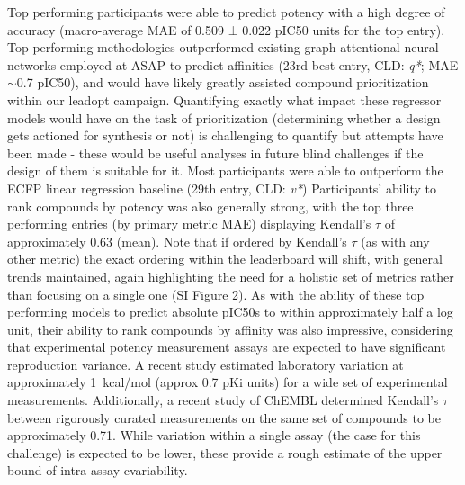 \documentclass[journal=jcim,manuscript=article]{achemso}
\begin{document}
Top performing participants were able to predict potency with a high degree of accuracy (macro-average MAE of 0.509 ± 0.022 pIC50 units for the top entry). Top performing methodologies outperformed existing graph attentional neural networks employed at ASAP to predict affinities (23rd best entry, CLD: \textit{q*}; MAE$\sim$0.7 pIC50), and would have likely greatly assisted compound prioritization within our leadopt campaign. Quantifying exactly what impact these regressor models would have on the task of prioritization (determining whether a design gets actioned for synthesis or not) is challenging to quantify but attempts have been made - these would be useful analyses in future blind challenges if the design of them is suitable for it.\cite{ash_practically_2024} Most participants were able to outperform the ECFP linear regression baseline (29th entry, CLD: \textit{v*}) Participants' ability to rank compounds by potency was also generally strong, with the top three performing entries (by primary metric MAE) displaying Kendall's $\tau$ of approximately 0.63 (mean). Note that if ordered by Kendall's $\tau$ (as with any other metric) the exact ordering within the leaderboard will shift, with general trends maintained, again highlighting the need for a holistic set of metrics rather than focusing on a single one (SI Figure 2). As with the ability of these top performing models to predict absolute pIC50s to within approximately half a log unit, their ability to rank compounds by affinity was also impressive, considering that experimental potency measurement assays are expected to have significant reproduction variance. A recent study estimated laboratory variation at approximately 1~kcal/mol (approx 0.7 pKi units)\cite{ross_maximal_2023} for a wide set of experimental measurements. Additionally, a recent study of ChEMBL\cite{landrum_combining_2024} determined Kendall's $\tau$ between rigorously curated measurements on the same set of compounds to be approximately 0.71. While variation within a single assay (the case for this challenge) is expected to be lower, these provide a rough estimate of the upper bound of intra-assay cvariability.
\end{document}
